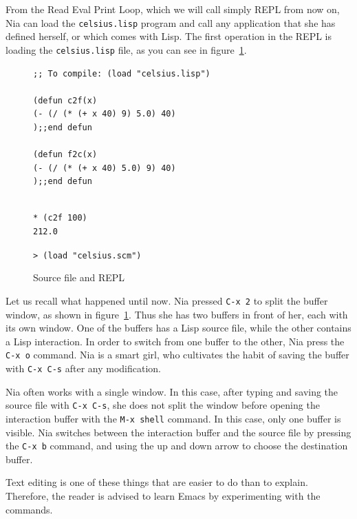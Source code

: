 \documentclass[a4paper,12pt]{book}
\newenvironment{fmpage}[1]
           {\begin{lrbox}{\fmbox}\begin{minipage}{#1}}
           {\end{minipage}\end{lrbox}\fbox{\usebox{\fmbox}}}
\begin{document}
From the Read Eval Print Loop, which we will call
simply REPL from now on,  Nia can load the
\verb|celsius.lisp| program and  call any application
that she has defined herself, or which comes with Lisp.
The first operation in the REPL is loading the
\verb|celsius.lisp| file, as you can see in
figure~\ref{fig:repl}.

\begin{figure}[!h]
\begin{fmpage}{0.8\linewidth}
\begin{verbatim}
;; To compile: (load "celsius.lisp")

(defun c2f(x)
(- (/ (* (+ x 40) 9) 5.0) 40)
);;end defun

(defun f2c(x)
(- (/ (* (+ x 40) 5.0) 9) 40)
);;end defun
\end{verbatim}
\end{fmpage}

\begin{fmpage}{0.8\linewidth}
\begin{verbatim}

* (c2f 100)
212.0
\end{verbatim}
\end{fmpage}

\begin{fmpage}{0.8\linewidth}
\verb|> (load "celsius.scm")|
\end{fmpage}
\caption{Source file and REPL}
\label{fig:repl}
\end{figure}

Let us recall what happened until now. Nia pressed
\verb|C-x 2| to split  the buffer window, as shown
in figure~\ref{fig:repl}. Thus she has two buffers
in front of her, each with its own window. One of
the buffers has a Lisp source file, while the other
contains a Lisp  interaction. In order to  switch
from one buffer to the other, Nia press the
\verb|C-x o| command. Nia is a smart girl, who
cultivates the habit of saving the buffer with
\verb|C-x C-s| after any modification.

Nia often works with a single window.  In this case,
after typing and saving the source file with
\verb|C-x C-s|, she does not split the window
before opening the interaction buffer with the
\verb|M-x shell| command. In this case, only one
buffer is visible. Nia switches  between the
interaction buffer and the source file by pressing
the  \verb|C-x b| command, and using the up and
down arrow to choose the destination buffer. 

Text editing is one of these things that
are easier to do than to explain. Therefore,
the reader is advised to learn Emacs
by experimenting with the commands.
\end{document}
